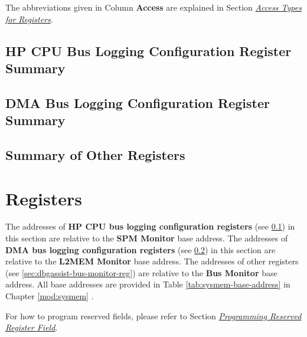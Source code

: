\documentclass[main\_\_EN.tex]{subfiles}
\begin{document}
The abbreviations given in Column \textbf{Access} are explained in Section \hyperref[glossary-access-types]{\textit{Access Types for Registers}}.

\subsection{HP CPU Bus Logging Configuration Register Summary}
\label{sec:dbgassist-spm-mem-monitor-reg-summ}




\subsection{DMA Bus Logging Configuration Register Summary}
\label{sec:dbgassist-l2-mem-monitor-reg-summ}




\subsection{Summary of Other Registers}
\label{sec:dbgassist-bus-monitor-reg-summ}





\newpage
\section{Registers}

The addresses of \textbf{HP CPU bus logging configuration registers} (see \ref{sec:dbgassist-spm-mem-monitor-reg-summ}) in this section are relative to the \textbf{SPM Monitor} base address. The addresses of \textbf{DMA bus logging configuration registers} (see \ref{sec:dbgassist-l2-mem-monitor-reg-summ}) in this section are relative to the \textbf{L2MEM Monitor} base address. The addresses of other registers (see \ref{sec:dbgassist-bus-monitor-reg}) are relative to the \textbf{Bus Monitor} base address. All base addresses are provided in Table \ref{tab:sysmem-base-address} in Chapter \ref{mod:sysmem} \textit{}.

For how to program reserved fields, please refer to Section \hyperref[programming-reserved-field]{\textit{Programming Reserved Register Field}}.
\end{document}

